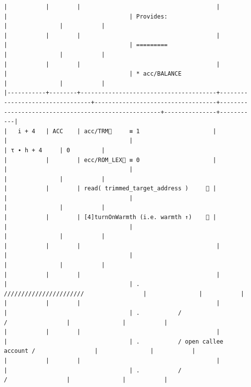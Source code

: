 \documentclass[varwidth=\maxdimen,margin=0.5cm,multi={verbatim}]{standalone}
\begin{document}
\begin{verbatim}
|           |        |                                       |                                 |                                   | Provides:                                           |               |           |
|           |        |                                       |                                 |                                   | =========                                           |               |           |
|           |        |                                       |                                 |                                   | * acc/BALANCE                                       |               |           |
|-----------+--------+---------------------------------------+---------------------------------+-----------------------------------+-----------------------------------------------------+---------------+-----------|
|   i + 4   | ACC    | acc/TRM🚩     ≡ 1                     |                                 |                                   |                                                     | τ ∙ h + 4     | 0         |
|           |        | ecc/ROM_LEX🚩 ≡ 0                     |                                 |                                   |                                                     |               |           |
|           |        | read( trimmed_target_address )     👋 |                                 |                                   |                                                     |               |           |
|           |        | [4]turnOnWarmth (i.e. warmth ↑)    👋 |                                 |                                   |                                                     |               |           |
|           |        |                                       |                                 |                                   |                                                     |               |           |
|           |        |                                       |                                 |                                   | .           ///////////////////////                 |               |           |
|           |        |                                       |                                 |                                   | .           /                     /                 |               |           |
|           |        |                                       |                                 |                                   | .           / open callee account /                 |               |           |
|           |        |                                       |                                 |                                   | .           /                     /                 |               |           |

\end{verbatim}
\end{document}
